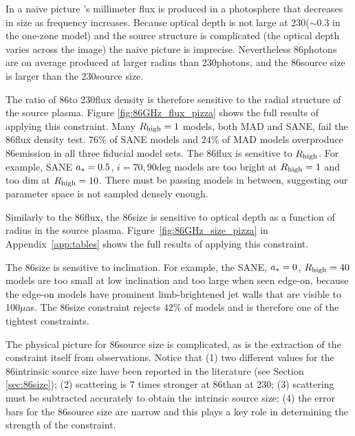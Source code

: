 
In a naive picture \sgra's millimeter flux is produced in a photosphere that decreases in size as frequency increases.  Because optical depth is not large at 230\GHz ($\sim 0.3$ in the one-zone model) and the source structure is complicated (the optical depth varies across the image) the naive picture is imprecise.  Nevertheless 86\GHz photons are on average produced at larger radius than 230\GHz photons, and the 86\GHz source size is larger than the 230\GHz source size.

The ratio of 86\GHz to 230\GHz flux density is therefore sensitive to the radial structure of the source plasma.  Figure \ref{fig:86GHz_flux_pizza} shows the full results of applying this constraint.
Many $R_\mathrm{high} = 1$ models, both MAD and SANE, fail the 86\GHz flux density test. $76\%$ of SANE models and $24\%$ of MAD models overproduce 86\GHz emission in all three fiducial model sets.%
The 86\GHz flux is sensitive to $R_\mathrm{high}$.  For example, SANE $a_* = 0.5$, $i = 70,90$deg models are too bright at $R_\mathrm{high} = 1$ and too dim at $R_\mathrm{high} = 10$.  There must be passing models in between, suggesting our parameter space is not sampled densely enough.


Similarly to the 86\GHz flux, the 86\GHz size is sensitive to optical depth as a function of radius in the source plasma. Figure~\ref{fig:86GHz_size_pizza} in Appendix~\ref{app:tables} shows the full results of applying this constraint.


The 86\GHz size is sensitive to inclination.  For example, the SANE, $a_* = 0$, $R_\mathrm{high} = 40$ models are too small at low inclination and too large when seen edge-on, because the edge-on models have prominent limb-brightened jet walls that are visible to 100$\mu$as.  The 86\GHz size constraint rejects
$42\%$ of models and is therefore one of the tightest constraints.

The physical picture for 86\GHz source size is complicated, as is the extraction of the constraint itself from observations.  Notice that (1) two different values for the 86\GHz intrinsic source size have been reported in the literature (see Section \ref{sec:86size}); (2) scattering is $7$ times stronger at 86\GHz than at 230\GHz; (3) scattering must be subtracted accurately to obtain the intrinsic source size; (4) the error bars for the 86\GHz source size are narrow and this plays a key role in determining the strength of the constraint.

